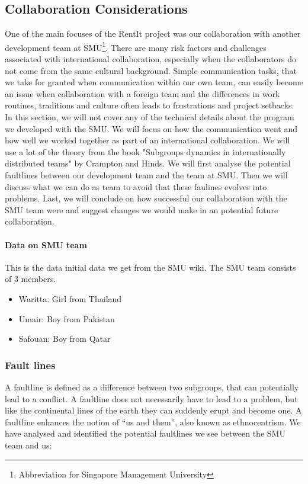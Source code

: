 \documentclass[a4paper,11pt,report]{article}
\begin{document}
{\subsection{Collaboration Considerations}
One of the main focuses of the RentIt project was our collaboration with another development team at SMU\footnote{Abbreviation for Singapore Management University}. There are many risk factors and challenges associated with international collaboration, especially when the collaborators do not come from the same cultural background. Simple communication tasks, that we take for granted when communication within our own team, can easily become an issue when collaboration with a foreign team and the differences in work routines, traditions and culture often leads to frustrations and project setbacks. \\

In this section, we will not cover any of the technical details about the program we developed with the SMU. We will focus on how the communication went and how well we worked together as part of an international collaboration. We will use a lot of the theory from the book "Subgroups dynamics in internationally distributed teams" by Crampton and Hinds. We will first analyse the potential faultlines\cite{smu} between our development team and the team at SMU. Then we will discuss what we can do as team to avoid that these faulines evolves into problems. Last, we will conclude on how successful our collaboration with the SMU team were and suggest changes we would make in an potential future collaboration.\\

\paragraph{Data on SMU team}

This is the data initial data we get from the SMU wiki. The SMU team consists of 3 members.\\

\begin{itemize}
\item Waritta: Girl from Thailand
\item Umair: Boy from Pakistan
\item Safouan: Boy from Qatar
\end{itemize}

\subsubsection{Fault lines}
A faultline is defined as a difference between two subgroups, that can potentially lead to a conflict. A faultline does not necessarily have to lead to a problem, but like the continental lines of the earth they can suddenly erupt and become one. A faultline enhances the notion of “us and them”, also known as ethnocentrism\cite{smu}. We have analysed and identified the potential faultlines we see between the SMU team and us:

}
\end{document}
